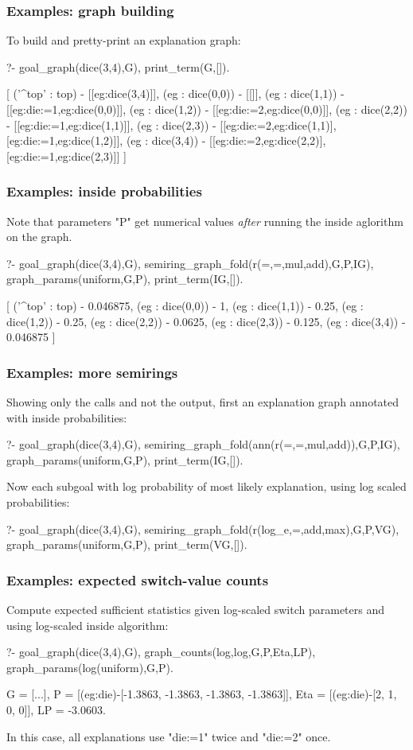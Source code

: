 \documentclass[usenames,dvipsnames]{beamer}
\newenvironment{isframe}[1][untitled]{\begin{frame}[fragile=singleslide,environment=isframe]\frametitle{#1}}{\end{frame}}
\begin{document}
\begin{isframe}[Examples: graph building]
To build and pretty-print an explanation graph:
\begin{prolog-barred}
  ?- goal_graph(dice(3,4),G), print_term(G,[]).

  [ ('^top' : top) - [[eg:dice(3,4)]],
    (eg : dice(0,0)) - [[]],
    (eg : dice(1,1)) - [[eg:die:=1,eg:dice(0,0)]],
    (eg : dice(1,2)) - [[eg:die:=2,eg:dice(0,0)]],
    (eg : dice(2,2)) - [[eg:die:=1,eg:dice(1,1)]],
    (eg : dice(2,3)) - [[eg:die:=2,eg:dice(1,1)],
                        [eg:die:=1,eg:dice(1,2)]],
    (eg : dice(3,4)) - [[eg:die:=2,eg:dice(2,2)],
                        [eg:die:=1,eg:dice(2,3)]]
  ]
\end{prolog-barred}
\end{isframe}

\begin{isframe}[Examples: inside probabilities]
Note that parameters "P" get numerical values \emph{after}
running the inside aglorithm on the graph.
\begin{prolog-barred}
	?- goal_graph(dice(3,4),G),
		 semiring_graph_fold(r(=,=,mul,add),G,P,IG),
		 graph_params(uniform,G,P),
		 print_term(IG,[]).

	[ ('^top' : top) - 0.046875,
		(eg : dice(0,0)) - 1,
		(eg : dice(1,1)) - 0.25,
		(eg : dice(1,2)) - 0.25,
		(eg : dice(2,2)) - 0.0625,
		(eg : dice(2,3)) - 0.125,
		(eg : dice(3,4)) - 0.046875
	]
\end{prolog-barred}
\end{isframe}

\begin{isframe}[Examples: more semirings]
Showing only the calls and not the output, first an explanation
graph annotated with inside probabilities:
\begin{prolog-barred}
	?- goal_graph(dice(3,4),G),
		 semiring_graph_fold(ann(r(=,=,mul,add)),G,P,IG),
		 graph_params(uniform,G,P),
		 print_term(IG,[]).
\end{prolog-barred}
Now each subgoal with log probability of most likely explanation,
using log scaled probabilities:
\begin{prolog-barred}
  ?- goal_graph(dice(3,4),G),
     semiring_graph_fold(r(log_e,=,add,max),G,P,VG),
     graph_params(uniform,G,P),
     print_term(VG,[]).
\end{prolog-barred}
\end{isframe}

\begin{isframe}[Examples: expected switch-value counts]
Compute expected sufficient statistics given log-scaled switch parameters
and using log-scaled inside algorithm:
\begin{prolog-barred}
  ?- goal_graph(dice(3,4),G),
     graph_counts(log,log,G,P,Eta,LP),
     graph_params(log(uniform),G,P).

  G = [...],
  P = [(eg:die)-[-1.3863, -1.3863, -1.3863, -1.3863]],
  Eta = [(eg:die)-[2, 1, 0, 0]],
  LP = -3.0603.
\end{prolog-barred}
In this case, all explanations use "die:=1" twice and "die:=2" once.
\end{isframe}
\end{document}
